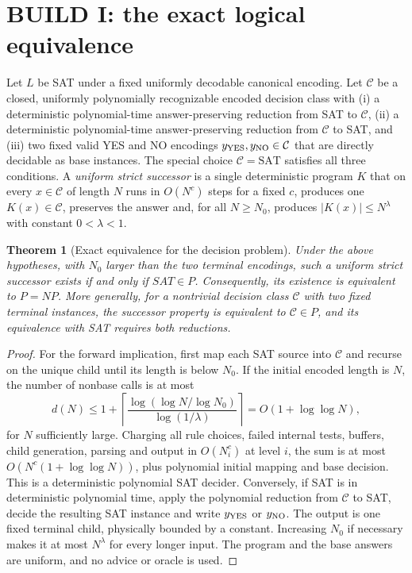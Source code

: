 \documentclass[11pt]{article}
\newtheorem{theorem}{Theorem}
\begin{document}
\section{BUILD I: the exact logical equivalence}
Let $L$ be SAT under a fixed uniformly decodable canonical encoding. Let $\mathcal C$ be a closed, uniformly polynomially recognizable encoded decision class with (i) a deterministic polynomial-time answer-preserving reduction from SAT to $\mathcal C$, (ii) a deterministic polynomial-time answer-preserving reduction from $\mathcal C$ to SAT, and (iii) two fixed valid YES and NO encodings $y_{\rm YES},y_{\rm NO}\in\mathcal C$ that are directly decidable as base instances. The special choice $\mathcal C=\mathrm{SAT}$ satisfies all three conditions. A \emph{uniform strict successor} is a single deterministic program $K$ that on every $x\in\mathcal C$ of length $N$ runs in $O(N^c)$ steps for a fixed $c$, produces one $K(x)\in\mathcal C$, preserves the answer and, for all $N\ge N_0$, produces $|K(x)|\le N^\lambda$ with constant $0<\lambda<1$.
\begin{theorem}[Exact equivalence for the decision problem]\label{thm:equiv}
Under the above hypotheses, with $N_0$ larger than the two terminal encodings, such a uniform strict successor exists if and only if $SAT\in P$. Consequently, its existence is equivalent to $P=NP$. More generally, for a nontrivial decision class $\mathcal C$ with two fixed terminal instances, the successor property is equivalent to $\mathcal C\in P$, and its equivalence with SAT requires both reductions.
\end{theorem}
\begin{proof}
For the forward implication, first map each SAT source into $\mathcal C$ and recurse on the unique child until its length is below $N_0$. If the initial encoded length is $N$, the number of nonbase calls is at most
\[
 d(N)\le 1+\left\lceil\frac{\log(\log N/\log N_0)}{\log(1/\lambda)}\right\rceil
 =O(1+\log\log N),
\]
for $N$ sufficiently large. Charging all rule choices, failed internal tests, buffers, child generation, parsing and output in $O(N_i^c)$ at level $i$, the sum is at most $O(N^c(1+\log\log N))$, plus polynomial initial mapping and base decision. This is a deterministic polynomial SAT decider. Conversely, if SAT is in deterministic polynomial time, apply the polynomial reduction from $\mathcal C$ to SAT, decide the resulting SAT instance and write $y_{\rm YES}$ or $y_{\rm NO}$. The output is one fixed terminal child, physically bounded by a constant. Increasing $N_0$ if necessary makes it at most $N^\lambda$ for every longer input. The program and the base answers are uniform, and no advice or oracle is used.\end{proof}
\end{document}
